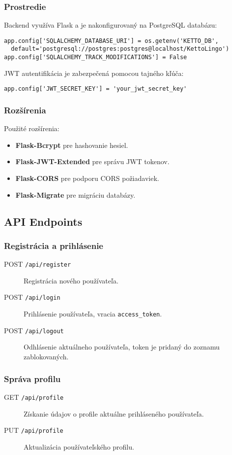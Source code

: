 \documentclass{article}
\begin{document}
\subsubsection{Prostredie}
Backend využíva Flask a je nakonfigurovaný na PostgreSQL databázu:
\begin{lstlisting}
app.config['SQLALCHEMY_DATABASE_URI'] = os.getenv('KETTO_DB', 
  default='postgresql://postgres:postgres@localhost/KettoLingo')
app.config['SQLALCHEMY_TRACK_MODIFICATIONS'] = False
\end{lstlisting}

JWT autentifikácia je zabezpečená pomocou tajného kľúča:
\begin{lstlisting}
app.config['JWT_SECRET_KEY'] = 'your_jwt_secret_key'
\end{lstlisting}

\subsubsection{Rozšírenia}
Použité rozšírenia:
\begin{itemize}
    \item \textbf{Flask-Bcrypt} pre hashovanie hesiel.
    \item \textbf{Flask-JWT-Extended} pre správu JWT tokenov.
    \item \textbf{Flask-CORS} pre podporu CORS požiadaviek.
    \item \textbf{Flask-Migrate} pre migráciu databázy.
\end{itemize}

\subsection{API Endpoints}
\subsubsection{Registrácia a prihlásenie}
\begin{description}
    \item[POST \texttt{/api/register}] Registrácia nového používateľa.
    \item[POST \texttt{/api/login}] Prihlásenie používateľa, vracia \texttt{access\_token}.
    \item[POST \texttt{/api/logout}] Odhlásenie aktuálneho používateľa, token je pridaný do zoznamu zablokovaných.
\end{description}

\subsubsection{Správa profilu}
\begin{description}
    \item[GET \texttt{/api/profile}] Získanie údajov o profile aktuálne prihláseného používateľa.
    \item[PUT \texttt{/api/profile}] Aktualizácia používateľského profilu.
\end{description}
\end{document}
